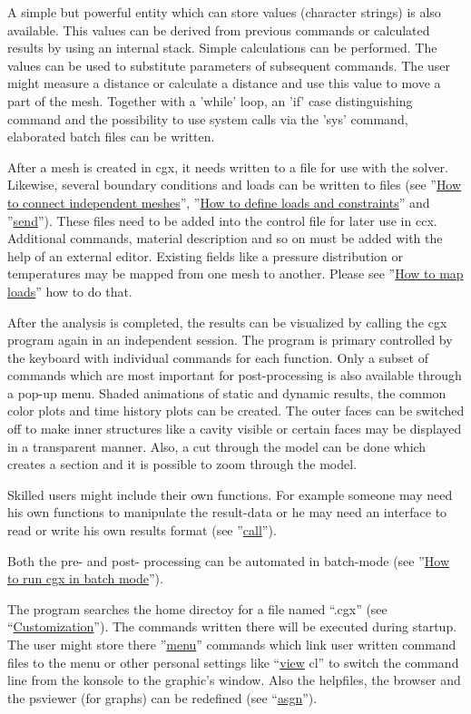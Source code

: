\documentclass{article}
\providecommand{\htmlref}[2]{\hyperref[#2]{#1}}
\begin{document}
A simple but powerful entity which can store values (character strings) is also available. This values can be derived from previous commands or calculated results by using an internal stack. Simple calculations can be performed. The values can be used to substitute parameters of subsequent commands. The user might measure a distance or calculate a distance and use this value to move a part of the mesh. Together with a 'while' loop, an 'if' case distinguishing command and the possibility to use system calls via the 'sys' command, elaborated batch files can be written.  

After a mesh is created in cgx, it needs written to a file for use with the solver. Likewise, several boundary conditions and loads can be written to files (see ''\htmlref{How to connect independent meshes}{How to connect independent meshes}'', ''\htmlref{How to define loads and constraints}{How to define loads and constraints}'' and ''\htmlref{send}{send}''). These files need to be added into the control file for later use in ccx. Additional commands, material description and so on must be added with the help of an external editor. Existing fields like a pressure distribution or temperatures may be mapped from one mesh to another. Please see ''\htmlref{How to map loads}{How to map loads}'' how to do that.

After the analysis is completed, the results can be visualized by calling the cgx program again in an independent session. The program is primary controlled by the keyboard with individual commands for each function. Only a subset of commands which are most important for post-processing is also available through a pop-up menu. Shaded animations of static and dynamic results, the common color plots and time history plots can be created. The outer faces can be switched off to make inner structures like a cavity visible or certain faces may be displayed in a transparent manner. Also, a cut through the model can be done which creates a section and it is possible to zoom through the model.

Skilled users might include their own functions. For example someone may need his own functions to manipulate the result-data or he may need an interface to read or write his own results format (see ''\htmlref{call}{call}'').

Both the pre- and post- processing can be automated in batch-mode (see ''\htmlref{How to run cgx in batch mode}{How to run cgx in batch mode}'').

The program searches the home directoy for a file named ``.cgx'' (see ``\htmlref{Customization}{Customization}''). The commands written there will be executed during startup. The user might store there ''\htmlref{menu}{menu}'' commands which link user written command files to the menu or other personal settings like ``\htmlref{view}{view} cl'' to switch the command line from the konsole to the graphic's window. Also the helpfiles, the browser and the psviewer (for graphs) can be redefined (see ``\htmlref{asgn}{asgn}''). 
\end{document}
